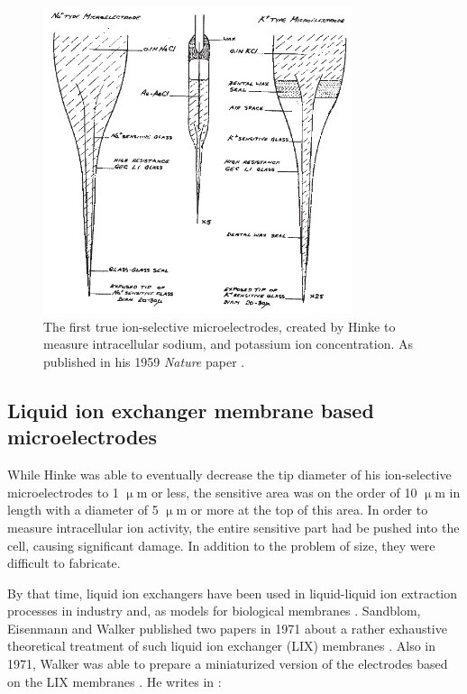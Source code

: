 \begin{figure}
\centering
\includegraphics[height=9cm, keepaspectratio]{img/theory/hinke.jpg}
\caption[The first true ion-selective microelectrodes, created by Hinke.]{The first true ion-selective microelectrodes, created by Hinke to measure intracellular sodium, and potassium ion concentration.
As published in his 1959 \emph{Nature} paper \cite{hinke1959glass}.}
\label{fig:hinke}
\end{figure}

\subsection{Liquid ion exchanger membrane based microelectrodes}
While Hinke was able to eventually decrease the tip diameter of his ion-selective microelectrodes to 1 $\upmu$m or less, the sensitive area was on the order of 10 $\upmu$m in length with a diameter of 5 $\upmu$m or more at the top of this area.
In order to measure intracellular ion activity, the entire sensitive part had be pushed into the cell, causing significant damage.
In addition to the problem of size, they were difficult to fabricate.

By that time, liquid ion exchangers have been used in liquid-liquid ion extraction processes in industry and, as models for biological membranes \cite{beutner1913new, eisenman1967membrane}.
Sandblom, Eisenmann and Walker published two papers in 1971 about a rather exhaustive theoretical treatment of such liquid ion exchanger (LIX) membranes \cite{walkerLIX1, walkerLIX2}.
Also in 1971, Walker was able to prepare a miniaturized version of the electrodes based on the LIX membranes \cite{walker1971ion}.
He writes in \cite{walker1971ion}:

